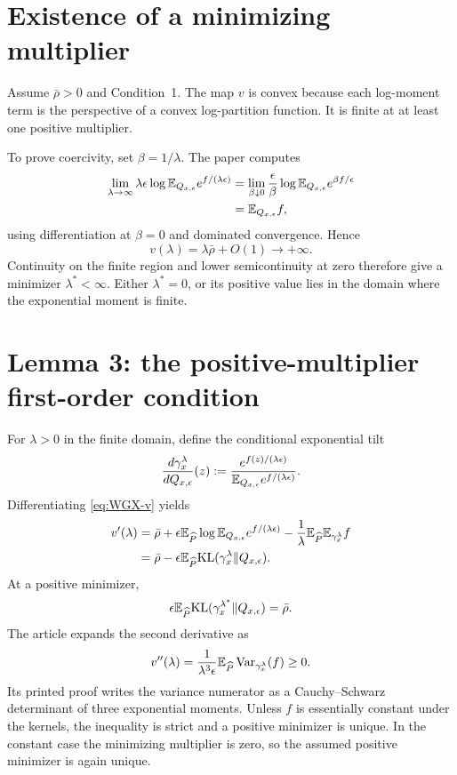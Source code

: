 \section{Existence of a minimizing multiplier}
Assume $\bar\rho>0$ and Condition~1.  The map $v$ is convex because each log-moment term is the perspective of a convex log-partition function.  It is finite at at least one positive multiplier.

To prove coercivity, set $\beta=1/\lambda$.  The paper computes
\begin{align*}
 \lim_{\lambda\to\infty}
 \lambda\epsilon\log\mathbb{E}_{Q_{x,\epsilon}}e^{f/(\lambda\epsilon)}
 &=\lim_{\beta\downarrow0}
 \frac{\epsilon}{\beta}\log\mathbb{E}_{Q_{x,\epsilon}}e^{\beta f/\epsilon}\\
 &=\mathbb{E}_{Q_{x,\epsilon}}f,
\end{align*}
using differentiation at $\beta=0$ and dominated convergence.  Hence
\[
 v(\lambda)=\lambda\bar\rho+O(1)\longrightarrow+\infty.
\]
Continuity on the finite region and lower semicontinuity at zero therefore give a minimizer $\lambda^*<\infty$.  Either $\lambda^*=0$, or its positive value lies in the domain where the exponential moment is finite.

\section{Lemma 3: the positive-multiplier first-order condition}
For $\lambda>0$ in the finite domain, define the conditional exponential tilt
\begin{equation}\label{eq:WGX-gamma-lambda}
 \frac{d\gamma_x^\lambda}{dQ_{x,\epsilon}}(z)
 :=\frac{e^{f(z)/(\lambda\epsilon)}}
 {\mathbb{E}_{Q_{x,\epsilon}}e^{f/(\lambda\epsilon)}}.
\end{equation}
Differentiating \eqref{eq:WGX-v} yields
\begin{align}
 v'(\lambda)
 &=\bar\rho
 +\epsilon\mathbb{E}_{\widehat P}
   \log\mathbb{E}_{Q_{x,\epsilon}}e^{f/(\lambda\epsilon)}
 -\frac1\lambda\mathbb{E}_{\widehat P}\mathbb{E}_{\gamma_x^\lambda}f\label{eq:WGX-vprime-source}\\
 &=\bar\rho
 -\epsilon\mathbb{E}_{\widehat P}
   \mathrm{KL}(\gamma_x^\lambda\|Q_{x,\epsilon}).\label{eq:WGX-vprime-KL}
\end{align}
At a positive minimizer,
\begin{equation}\label{eq:WGX-binding}
 \epsilon\mathbb{E}_{\widehat P}
 \mathrm{KL}(\gamma_x^{\lambda^*}\|Q_{x,\epsilon})=\bar\rho.
\end{equation}
The article expands the second derivative as
\begin{equation}\label{eq:WGX-vsecond}
 v''(\lambda)
 =\frac{1}{\lambda^3\epsilon}
 \mathbb{E}_{\widehat P}\operatorname{Var}_{\gamma_x^\lambda}(f)\ge0.
\end{equation}
Its printed proof writes the variance numerator as a Cauchy--Schwarz determinant of three exponential moments.  Unless $f$ is essentially constant under the kernels, the inequality is strict and a positive minimizer is unique.  In the constant case the minimizing multiplier is zero, so the assumed positive minimizer is again unique.

